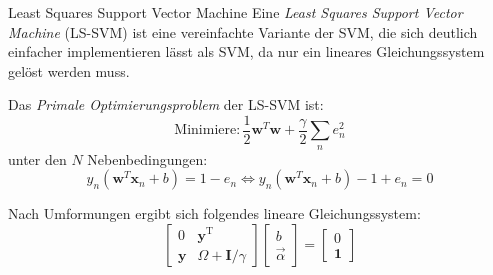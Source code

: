 \begin{defi}{Least Squares Support Vector Machine}
    Eine \emph{Least Squares Support Vector Machine} (LS-SVM) ist eine vereinfachte Variante der SVM, die sich deutlich einfacher implementieren lässt als SVM, da nur ein lineares Gleichungssystem gelöst werden muss.

    Das \emph{Primale Optimierungsproblem} der LS-SVM ist:
    \[
        \text{Minimiere}: \frac{1}{2} \mathbf{w}^T \mathbf{w} + \frac{\gamma}{2} \sum_n e^2_n
    \]
    unter den $N$ Nebenbedingungen:
    \[
        y_n (\mathbf{w}^T \mathbf{x}_n + b) = 1 - e_n \iff y_n (\mathbf{w}^T \mathbf{x}_n + b) - 1 + e_n = 0
    \]

    Nach Umformungen ergibt sich folgendes lineare Gleichungssystem:
    \[
        \renewcommand\arraystretch{1.3}
        \left[
            \begin{array}{c|c}
                0          & \mathbf{y}^\text{T}        \\
                \hline
                \mathbf{y} & \Omega + \mathbf{I}/\gamma
            \end{array}
            \right]
        \left[
            \begin{array}{c}
                b \\
                \hline
                \vec{\alpha}
            \end{array}
            \right]
        =
        \left[
            \begin{array}{c}
                0 \\
                \hline
                \mathbf{1}
            \end{array}
            \right]
    \]


\end{defi}
